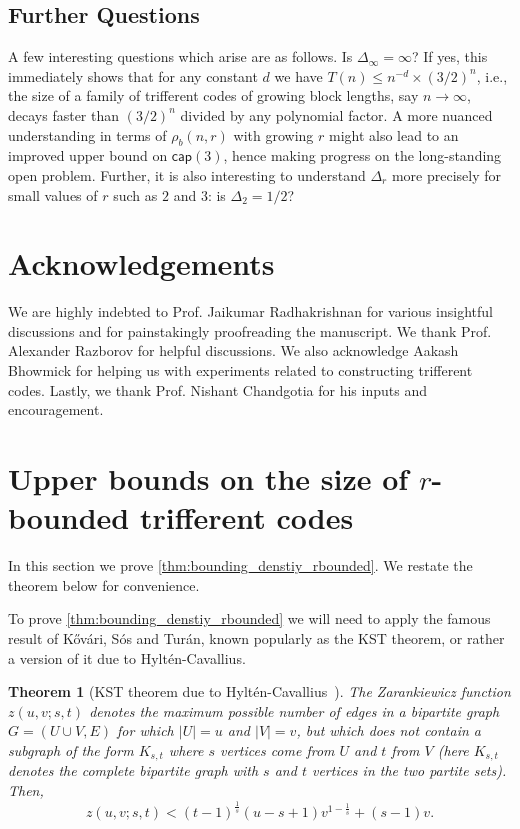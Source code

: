 \documentclass[10pt,a4paper]{article}
\newcommand{\rbdtrifferentcodes}{$r$-bounded trifferent code}
\newcommand{\bcap}{\mathsf{cap}}
\newtheorem{theorem}{Theorem}[section]
\DeclareMathOperator{\1}{\mathbf{1}}
\begin{document}
\subsection*{Further Questions}

A few interesting questions which arise are as follows. Is $\Delta_\infty = \infty$? If yes, this immediately shows that for any constant $d$ we have $T(n)\leq n^{-d}\times (3/2)^n$, i.e., the size of a family of trifferent codes of growing block lengths, say $n \to \infty$, decays faster than $(3/2)^n$ divided by any polynomial factor.
A more nuanced understanding in terms of $\rho_b(n,r)$ with growing $r$ might also lead to an improved upper bound on $\bcap(3)$, hence making progress on the long-standing open problem.
Further, it is also interesting to understand $\Delta_r$ more precisely for small values of $r$ such as $2$ and $3$: is $\Delta_2=1/2$?



\section*{Acknowledgements}
    We are highly indebted to Prof. Jaikumar Radhakrishnan for various insightful discussions and for painstakingly proofreading the manuscript. 
We thank Prof. Alexander Razborov for helpful discussions. 
We also acknowledge Aakash Bhowmick for helping us with experiments related to constructing trifferent codes. 
Lastly, we thank Prof. Nishant Chandgotia for his inputs and encouragement.



\section{Upper bounds on the size of \rbdtrifferentcodes{s}}
\label{sec:upper_bd_rbdtrifferentcodes}

In this section we prove \cref{thm:bounding_denstiy_rbounded}.
We restate the theorem below for convenience. 

\denstiyrbounded*

To prove \cref{thm:bounding_denstiy_rbounded} we will need to apply the famous result of K\H{o}v\'{a}ri, S\'{o}s and Tur\'{a}n, known popularly as the KST theorem, or rather a version of it due to Hyltén-Cavallius.

\begin{theorem}[KST theorem due to Hyltén-Cavallius~\cite{HyltenCavallius1958}]
\label{thm:KST}
The Zarankiewicz function $z(u,v;s,t)$ denotes the maximum possible number of edges in a bipartite graph $G=(U\cup V, E)$ for which $|U|=u$ and $|V|=v$, but which does not contain a subgraph of the form $K_{s,t}$ where $s$ vertices come from $U$ and $t$ from $V$ (here $K_{s,t}$ denotes the complete bipartite graph with $s$ and $t$ vertices in the two partite sets).
Then, $$z(u,v;s,t) < (t-1)^{\frac{1}{s}} (u-s+1) v^{1-\frac{1}{s}} + (s-1)v.$$

\end{theorem}
\end{document}
